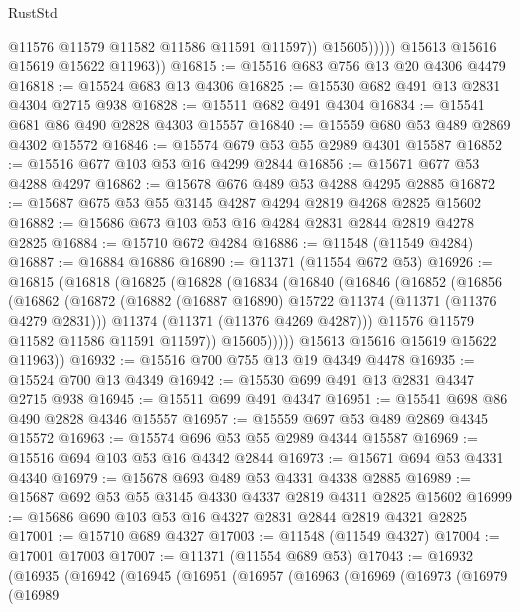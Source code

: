 \begin{lexlean}{RustStd}
\begin{coremodule}
{\begin{coremodule}
{{{{{{{{{{{{{{{{{{{{{{{{{{{{{{{{{                      @11576
                      @11579
                      @11582
                      @11586
                      @11591
                      @11597))
                  @15605)))))
        @15613
        @15616
        @15619
        @15622
        @11963))
@16815 := @15516 @683 @756 @13 @20 @4306 @4479
@16818 := @15524 @683 @13 @4306
@16825 := @15530 @682 @491 @13 @2831 @4304 @2715 @938
@16828 := @15511 @682 @491 @4304
@16834 := @15541 @681 @86 @490 @2828 @4303 @15557
@16840 := @15559 @680 @53 @489 @2869 @4302 @15572
@16846 := @15574 @679 @53 @55 @2989 @4301 @15587
@16852 := @15516 @677 @103 @53 @16 @4299 @2844
@16856 := @15671 @677 @53 @4288 @4297
@16862 := @15678 @676 @489 @53 @4288 @4295 @2885
@16872 := @15687 @675 @53 @55 @3145 @4287 @4294 @2819 @4268 @2825 @15602
@16882 := @15686 @673 @103 @53 @16 @4284 @2831 @2844 @2819 @4278 @2825
@16884 := @15710 @672 @4284
@16886 := @11548 (@11549 @4284)
@16887 := @16884 @16886
@16890 := @11371 (@11554 @672 @53)
@16926 := @16815
    (@16818
      (@16825
        (@16828
          (@16834
            (@16840
              (@16846
                (@16852
                  (@16856
                    (@16862
                      (@16872
                        (@16882 (@16887 @16890) @15722 @11374 (@11371 (@11376 @4279 @2831)))
                        @11374
                        (@11371 (@11376 @4269 @4287)))
                      @11576
                      @11579
                      @11582
                      @11586
                      @11591
                      @11597))
                  @15605)))))
        @15613
        @15616
        @15619
        @15622
        @11963))
@16932 := @15516 @700 @755 @13 @19 @4349 @4478
@16935 := @15524 @700 @13 @4349
@16942 := @15530 @699 @491 @13 @2831 @4347 @2715 @938
@16945 := @15511 @699 @491 @4347
@16951 := @15541 @698 @86 @490 @2828 @4346 @15557
@16957 := @15559 @697 @53 @489 @2869 @4345 @15572
@16963 := @15574 @696 @53 @55 @2989 @4344 @15587
@16969 := @15516 @694 @103 @53 @16 @4342 @2844
@16973 := @15671 @694 @53 @4331 @4340
@16979 := @15678 @693 @489 @53 @4331 @4338 @2885
@16989 := @15687 @692 @53 @55 @3145 @4330 @4337 @2819 @4311 @2825 @15602
@16999 := @15686 @690 @103 @53 @16 @4327 @2831 @2844 @2819 @4321 @2825
@17001 := @15710 @689 @4327
@17003 := @11548 (@11549 @4327)
@17004 := @17001 @17003
@17007 := @11371 (@11554 @689 @53)
@17043 := @16932
    (@16935
      (@16942
        (@16945
          (@16951
            (@16957
              (@16963
                (@16969
                  (@16973
                    (@16979
                      (@16989
}}}}}}}}}}}}}}}}}}}}}}}}}}}}}}}}}
\end{coremodule}}
\end{coremodule}
\end{lexlean}
